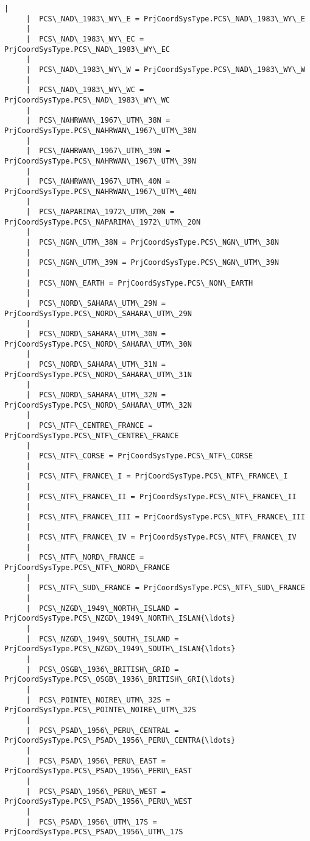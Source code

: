 \documentclass[11pt]{article}
\begin{document}
\begin{Verbatim}[commandchars=\\\{\}]
     |  
     |  PCS\_NAD\_1983\_WY\_E = PrjCoordSysType.PCS\_NAD\_1983\_WY\_E
     |  
     |  PCS\_NAD\_1983\_WY\_EC = PrjCoordSysType.PCS\_NAD\_1983\_WY\_EC
     |  
     |  PCS\_NAD\_1983\_WY\_W = PrjCoordSysType.PCS\_NAD\_1983\_WY\_W
     |  
     |  PCS\_NAD\_1983\_WY\_WC = PrjCoordSysType.PCS\_NAD\_1983\_WY\_WC
     |  
     |  PCS\_NAHRWAN\_1967\_UTM\_38N = PrjCoordSysType.PCS\_NAHRWAN\_1967\_UTM\_38N
     |  
     |  PCS\_NAHRWAN\_1967\_UTM\_39N = PrjCoordSysType.PCS\_NAHRWAN\_1967\_UTM\_39N
     |  
     |  PCS\_NAHRWAN\_1967\_UTM\_40N = PrjCoordSysType.PCS\_NAHRWAN\_1967\_UTM\_40N
     |  
     |  PCS\_NAPARIMA\_1972\_UTM\_20N = PrjCoordSysType.PCS\_NAPARIMA\_1972\_UTM\_20N
     |  
     |  PCS\_NGN\_UTM\_38N = PrjCoordSysType.PCS\_NGN\_UTM\_38N
     |  
     |  PCS\_NGN\_UTM\_39N = PrjCoordSysType.PCS\_NGN\_UTM\_39N
     |  
     |  PCS\_NON\_EARTH = PrjCoordSysType.PCS\_NON\_EARTH
     |  
     |  PCS\_NORD\_SAHARA\_UTM\_29N = PrjCoordSysType.PCS\_NORD\_SAHARA\_UTM\_29N
     |  
     |  PCS\_NORD\_SAHARA\_UTM\_30N = PrjCoordSysType.PCS\_NORD\_SAHARA\_UTM\_30N
     |  
     |  PCS\_NORD\_SAHARA\_UTM\_31N = PrjCoordSysType.PCS\_NORD\_SAHARA\_UTM\_31N
     |  
     |  PCS\_NORD\_SAHARA\_UTM\_32N = PrjCoordSysType.PCS\_NORD\_SAHARA\_UTM\_32N
     |  
     |  PCS\_NTF\_CENTRE\_FRANCE = PrjCoordSysType.PCS\_NTF\_CENTRE\_FRANCE
     |  
     |  PCS\_NTF\_CORSE = PrjCoordSysType.PCS\_NTF\_CORSE
     |  
     |  PCS\_NTF\_FRANCE\_I = PrjCoordSysType.PCS\_NTF\_FRANCE\_I
     |  
     |  PCS\_NTF\_FRANCE\_II = PrjCoordSysType.PCS\_NTF\_FRANCE\_II
     |  
     |  PCS\_NTF\_FRANCE\_III = PrjCoordSysType.PCS\_NTF\_FRANCE\_III
     |  
     |  PCS\_NTF\_FRANCE\_IV = PrjCoordSysType.PCS\_NTF\_FRANCE\_IV
     |  
     |  PCS\_NTF\_NORD\_FRANCE = PrjCoordSysType.PCS\_NTF\_NORD\_FRANCE
     |  
     |  PCS\_NTF\_SUD\_FRANCE = PrjCoordSysType.PCS\_NTF\_SUD\_FRANCE
     |  
     |  PCS\_NZGD\_1949\_NORTH\_ISLAND = PrjCoordSysType.PCS\_NZGD\_1949\_NORTH\_ISLAN{\ldots}
     |  
     |  PCS\_NZGD\_1949\_SOUTH\_ISLAND = PrjCoordSysType.PCS\_NZGD\_1949\_SOUTH\_ISLAN{\ldots}
     |  
     |  PCS\_OSGB\_1936\_BRITISH\_GRID = PrjCoordSysType.PCS\_OSGB\_1936\_BRITISH\_GRI{\ldots}
     |  
     |  PCS\_POINTE\_NOIRE\_UTM\_32S = PrjCoordSysType.PCS\_POINTE\_NOIRE\_UTM\_32S
     |  
     |  PCS\_PSAD\_1956\_PERU\_CENTRAL = PrjCoordSysType.PCS\_PSAD\_1956\_PERU\_CENTRA{\ldots}
     |  
     |  PCS\_PSAD\_1956\_PERU\_EAST = PrjCoordSysType.PCS\_PSAD\_1956\_PERU\_EAST
     |  
     |  PCS\_PSAD\_1956\_PERU\_WEST = PrjCoordSysType.PCS\_PSAD\_1956\_PERU\_WEST
     |  
     |  PCS\_PSAD\_1956\_UTM\_17S = PrjCoordSysType.PCS\_PSAD\_1956\_UTM\_17S

\end{Verbatim}
\end{document}
